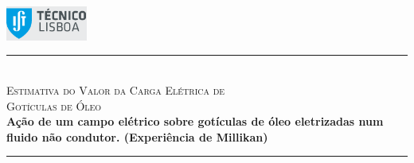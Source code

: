 \documentclass[a4paper,twoside,12pt]{article}      %
\author{Prof. Bernardo B. Carvalho}
\date{ Setembro 2012}
\newcommand{\HRule}{\rule{\linewidth}{0.5mm}}
\begin{document}
 

	\includegraphics[width=0.2\textwidth]{../logo-ist}%

		\HRule \\[0.5cm]
	{ \huge \sf  \textsc{Estimativa do Valor da Carga Elétrica de \\
		Gotículas de Óleo} }\\[0.4cm] %
	{ \large \bfseries  
Ação de um campo elétrico sobre gotículas de óleo eletrizadas num fluido não 
condutor. (Experiência de Millikan)}\\
	\HRule \\%


\end{document}

